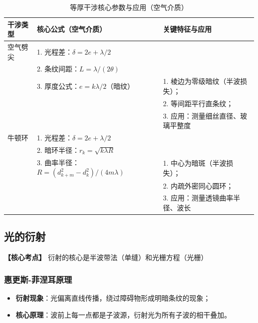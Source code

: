 \begin{table}[htbp]
    \centering
    \small  %
    \renewcommand{\arraystretch}{1.5}  %
    \begin{tabular}{@{}p{2.5cm}|p{4.5cm}|p{5cm}@{}}  %
        \toprule
        \rowcolor[RGB]{230,240,250} 干涉类型 & 核心公式（空气介质） & 关键特征与应用 \\
        \midrule
        空气劈尖 & 1. 光程差：$\delta=2e+\lambda/2$ \\ 
                  & 2. 条纹间距：$L=\lambda/(2\theta)$ \\
                  & 3. 厚度公式：$e=k\lambda/2$（暗纹） & 1. 棱边为零级暗纹（半波损失）； \\
                  &                                   & 2. 等间距平行直条纹； \\
                  &                                   & 3. 应用：测量细丝直径、玻璃平整度 \\
        \midrule
        牛顿环 & 1. 光程差：$\delta=2e+\lambda/2$ \\
                & 2. 暗环半径：$r_k=\sqrt{k\lambda R}$ \\
                & 3. 曲率半径：$R=(d_{k+m}^2-d_k^2)/(4m\lambda)$ & 1. 中心为暗斑（半波损失）； \\
                &                                             & 2. 内疏外密同心圆环； \\
                &                                             & 3. 应用：测量透镜曲率半径、波长 \\
        \bottomrule
    \end{tabular}
    \caption{等厚干涉核心参数与应用（空气介质）}
    \label{tab:equal_thickness_interference}
\end{table}
\vspace{0.5em}

\subsection{光的衍射}
\textbf{【核心考点】} 衍射的核心是半波带法（单缝）和光栅方程（光栅） \par\vspace{0.3em}

\subsubsection{惠更斯-菲涅耳原理}
\begin{itemize}
    \item \textbf{衍射现象}：光偏离直线传播，绕过障碍物形成明暗条纹的现象；
    \item \textbf{核心原理}：波前上每一点都是子波源，衍射光为所有子波的相干叠加。
\end{itemize}
\vspace{0.5em}

